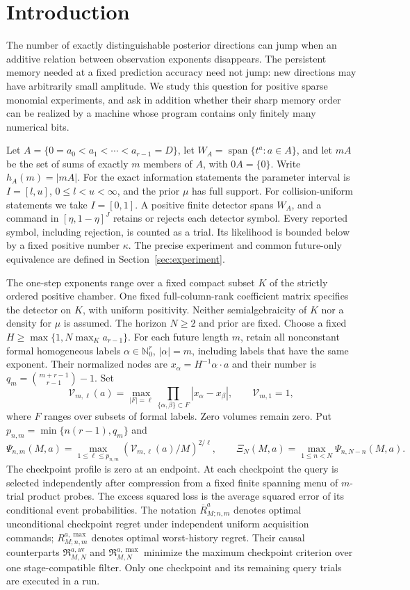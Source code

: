 \section{Introduction}
The number of exactly distinguishable posterior directions can jump when
an additive relation between observation exponents disappears. The
persistent memory needed at a fixed prediction accuracy need not jump:
new directions may have arbitrarily small amplitude. We study this
question for positive sparse monomial experiments, and ask in addition
whether their sharp memory order can be realized by a machine whose
program contains only finitely many numerical bits.

Let $A=\{0=a_0<a_1<\cdots<a_{r-1}=D\}$, let
$W_A=\operatorname{span}\{t^a:a\in A\}$, and let $mA$ be the
set of sums of exactly $m$ members of $A$, with $0A=\{0\}$.
Write $h_A(m)=|mA|$. For the exact information statements the parameter
interval is $I=[l,u]$, $0\le l<u<\infty$, and the prior $\mu$ has
full support. For collision-uniform statements we take $I=[0,1]$.
A positive finite detector spans $W_A$, and a command in
$[\eta,1-\eta]^J$ retains or rejects each detector symbol. Every
reported symbol, including rejection, is counted as a trial. Its
likelihood is bounded below by a fixed positive number $\kappa$.
The precise experiment and common future-only equivalence are defined
in Section~\ref{sec:experiment}.

The one-step exponents range over a fixed compact subset $K$ of the
strictly ordered positive chamber. One fixed full-column-rank coefficient
matrix specifies the detector on $K$, with uniform positivity. Neither
semialgebraicity of $K$ nor a density for $\mu$ is assumed. The horizon
$N\ge2$ and prior are fixed. Choose a fixed
$H\ge\max\{1,N\max_Ka_{r-1}\}$. For each future length $m$, retain
all nonconstant formal homogeneous labels $\alpha\in\mathbb N_0^r$,
$|\alpha|=m$, including labels that have the same exponent. Their
normalized nodes are $x_\alpha=H^{-1}\alpha\cdot a$ and their number
is $q_m=\binom{m+r-1}{r-1}-1$. Set
\[
 \mathcal V_{m,\ell}(a)=\max_{|F|=\ell}
         \prod_{\{\alpha,\beta\}\subset F}|x_\alpha-x_\beta|,
 \qquad \mathcal V_{m,1}=1,
\]
where $F$ ranges over subsets of formal labels. Zero volumes remain
zero. Put $p_{n,m}=\min\{n(r-1),q_m\}$ and
\[
 \Psi_{n,m}(M,a)=\max_{1\le\ell\le p_{n,m}}
           (\mathcal V_{m,\ell}(a)/M)^{2/\ell},\qquad
 \Xi_N(M,a)=\max_{1\le n<N}\Psi_{n,N-n}(M,a).
\]
The checkpoint profile is zero at an endpoint. At each checkpoint the
query is selected independently after compression from a fixed finite
spanning menu of $m$-trial product probes. The excess squared loss is
the average squared error of its conditional event probabilities.
The notation $\overline R_{M;n,m}^a$ denotes optimal unconditional
checkpoint regret under independent uniform acquisition commands;
$R_{M;n,m}^{a,\max}$ denotes optimal worst-history regret.
Their causal counterparts $\mathfrak R^{a,\mathrm{av}}_{M,N}$ and
$\mathfrak R^{a,\max}_{M,N}$ minimize the maximum checkpoint criterion
over one stage-compatible filter. Only one checkpoint and its remaining
query trials are executed in a run.

